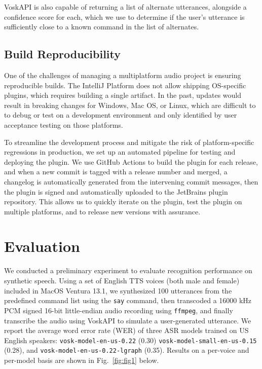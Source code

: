 \documentclass[conference]{IEEEtran}
\begin{document}
VoskAPI is also capable of returning a list of alternate utterances, alongside a confidence score for each, which we use to determine if the user's utterance is sufficiently close to a known command in the list of alternates.

\subsection{Build Reproducibility}

One of the challenges of managing a multiplatform audio project is ensuring reproducible builds. The IntelliJ Platform does not allow shipping OS-specific plugins, which requires building a single artifact. In the past, updates would result in breaking changes for Windows, Mac OS, or Linux, which are difficult to to debug or test on a development environment and only identified by user acceptance testing on those platforms.

To streamline the development process and mitigate the risk of platform-specific regressions in production, we set up an automated pipeline for testing and deploying the plugin. We use GitHub Actions to build the plugin for each release, and when a new commit is tagged with a release number and merged, a changelog is automatically generated from the intervening commit messages, then the plugin is signed and automatically uploaded to the JetBrains plugin repository. This allows us to quickly iterate on the plugin, test the plugin on multiple platforms, and to release new versions with assurance.

\section{Evaluation}

We conducted a preliminary experiment to evaluate recognition performance on synthetic speech. Using a set of English TTS voices (both male and female) included in MacOS Ventura 13.1, we synthesized 100 utterances from the predefined command list using the \texttt{say} command, then transcoded a 16000 kHz PCM signed 16-bit little-endian audio recording using \texttt{ffmpeg}, and finally transcribe the audio using VoskAPI to simulate a user-generated utterance. We report the average word error rate (WER) of three ASR models trained on US English speakers: \texttt{vosk-model-en-us-0.22} (0.30) \texttt{vosk-model-small-en-us-0.15} (0.28), and \texttt{vosk-model-en-us-0.22-lgraph} (0.35). Results on a per-voice and per-model basis are shown in  Fig.~\ref{fig:fig1} below.
\end{document}

